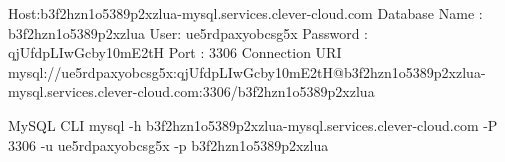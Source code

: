 Host:b3f2hzn1o5389p2xzlua-mysql.services.clever-cloud.com
Database Name : b3f2hzn1o5389p2xzlua
User: ue5rdpaxyobcsg5x
Password : qjUfdpLIwGcby10mE2tH
Port : 3306
Connection URI
mysql://ue5rdpaxyobcsg5x:qjUfdpLIwGcby10mE2tH@b3f2hzn1o5389p2xzlua-mysql.services.clever-cloud.com:3306/b3f2hzn1o5389p2xzlua

MySQL CLI
mysql -h b3f2hzn1o5389p2xzlua-mysql.services.clever-cloud.com -P 3306 -u ue5rdpaxyobcsg5x -p b3f2hzn1o5389p2xzlua